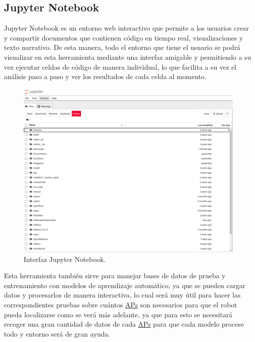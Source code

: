 \subsection{Jupyter Notebook}
\label{subsec:Jupyter}

Jupyter Notebook es un entorno web interactivo que permite a los usuarios crear y compartir documentos que contienen código en tiempo real, visualizaciones y texto narrativo. De esta manera, todo el entorno que tiene el usuario se podrá visualizar en esta herramienta mediante una interfaz amigable y permitiendo a su vez ejecutar celdas de código de manera individual, lo que facilita a su vez el análisis paso a paso y ver los resultados de cada celda al momento.\\

\begin{figure}[H]
  \centering
  \includegraphics[scale=0.4]{figs/jup1} %
  \caption{Interfaz Jupyter Notebook.}
  \label{fig:jup1}
\end{figure}

Esta herramienta también sirve para manejar bases de datos de prueba y entrenamiento con modelos de aprendizaje automático, ya que se pueden cargar datos y procesarlos de manera interactiva, lo cual será muy útil para hacer las correspondientes pruebas sobre cuántos \hyperlink{APs}{APs} son necesarios para que el robot pueda localizarse como se verá más adelante, ya que para esto se necesitará recoger una gran cantidad de datos de cada \hyperlink{APs}{APs} para que cada modelo procese todo y entorno será de gran ayuda.



